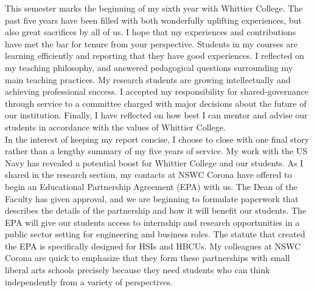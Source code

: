 \documentclass[../main.tex]{subfiles}
\begin{document}
This semester marks the beginning of my sixth year with Whittier College.  The past five years have been filled with both wonderfully uplifting experiences, but also great sacrifices by all of us.  I hope that my experiences and contributions have met the bar for tenure from your perspective.  Students in my courses are learning efficiently and reporting that they have good experiences.  I reflected on my teaching philosophy, and answered pedagogical questions surrounding my main teaching practices.  My research students are growing intellectually and achieving professional success.  I accepted my responsibility for shared-governance through service to a committee charged with major decisions about the future of our institution.  Finally, I have reflected on how best I can mentor and advise our students in accordance with the values of Whittier College. 
\\
\vspace{0.15cm}
In the interest of keeping my report concise, I choose to close with one final story rather than a lengthy summary of my five years of service.  My work with the US Navy has revealed a potential boost for Whittier College and our students.  As I shared in the research section, my contacts at NSWC Corona have offered to begin an Educational Partnership Agreement (EPA) with us.  The Dean of the Faculty has given approval, and we are beginning to formulate paperwork that describes the details of the partnership and how it will benefit our students.  The EPA will give our students access to internship and research opportunities in a public sector setting for engineering and business roles.  The statute that created the EPA is specifically designed for HSIs and HBCUs.  My colleagues at NSWC Corona are quick to emphasize that they form these partnerships with small liberal arts schools precisely because they need students who can think independently from a variety of perspectives.
\\
\vspace{0.15cm}
\end{document}
